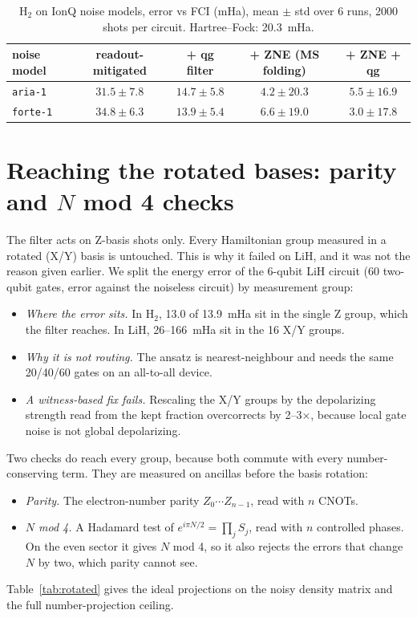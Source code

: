 \documentclass[11pt]{article}
\begin{document}
\begin{table}[t]
\centering\small
\caption{H$_2$ on IonQ noise models, error vs FCI (mHa), mean $\pm$ std over 6 runs, 2000 shots per
circuit. Hartree--Fock: 20.3~mHa.}
\label{tab:ionq}
\begin{tabular}{lcccc}
\toprule
noise model & readout-mitigated & + qg filter & + ZNE (MS folding) & + ZNE + qg\\
\midrule
\texttt{aria-1} & $31.5\pm7.8$ & $\mathbf{14.7\pm5.8}$ & $4.2\pm20.3$ & $5.5\pm16.9$\\
\texttt{forte-1} & $34.8\pm6.3$ & $\mathbf{13.9\pm5.4}$ & $6.6\pm19.0$ & $3.0\pm17.8$\\
\bottomrule
\end{tabular}
\end{table}

\section{Reaching the rotated bases: parity and $N$ mod 4 checks}\label{sec:rotated}

The filter acts on Z-basis shots only. Every Hamiltonian group measured in a rotated (X/Y) basis is
untouched. This is why it failed on LiH, and it was not the reason given earlier. We split the energy
error of the 6-qubit LiH circuit (60 two-qubit gates, error against the noiseless circuit) by
measurement group:
\begin{itemize}
\item \emph{Where the error sits.} In H$_2$, 13.0 of 13.9~mHa sit in the single Z group, which the
filter reaches. In LiH, 26--166~mHa sit in the 16 X/Y groups.
\item \emph{Why it is not routing.} The ansatz is nearest-neighbour and needs the same 20/40/60 gates
on an all-to-all device.
\item \emph{A witness-based fix fails.} Rescaling the X/Y groups by the depolarizing strength read from
the kept fraction overcorrects by 2--3$\times$, because local gate noise is not global depolarizing.
\end{itemize}

Two checks do reach every group, because both commute with every number-conserving term. They are
measured on ancillas before the basis rotation:
\begin{itemize}
\item \emph{Parity.} The electron-number parity $Z_0\cdots Z_{n-1}$, read with $n$ CNOTs.
\item \emph{$N$ mod 4.} A Hadamard test of $e^{i\pi N/2}=\prod_j S_j$, read with $n$ controlled phases.
On the even sector it gives $N$ mod 4, so it also rejects the errors that change $N$ by two, which
parity cannot see.
\end{itemize}
Table~\ref{tab:rotated} gives the ideal projections on the noisy density matrix and the full
number-projection ceiling.
\end{document}
